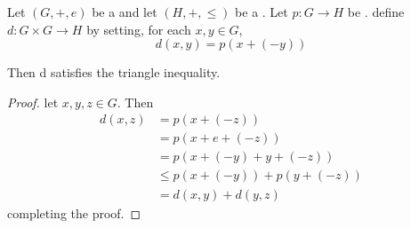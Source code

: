 \begin{prop}
    \label{prop:subadditiveinducestriangleinequality}
    Let $(G,+, e)$ be a 
	\Group and let $(H,+,\leq)$ be a 
	\TotallyOrderedMagma
	. 
    Let $p:G \to H$ be \Subadditive. 
    define $d:G \times G \to H$ by setting, for each $x,y \in G$, 
    \begin{equation}
        d(x,y) =  p(x+(-y))
    \end{equation}

    Then d satisfies the triangle inequality. 

    \begin{proof}
    let $x,y, z \in G$. Then
    \begin{align*}
        d(x,z) &= p(x+(-z))\\
        & = p(x+e+(-z))\\
        & = p(x+(-y)+y+(-z))\\
        & \leq p(x+(-y))+p(y+(-z))\\
        & = d(x,y)+d(y,z)
    \end{align*}
    completing the proof. 
    \end{proof} 
\end{prop}
